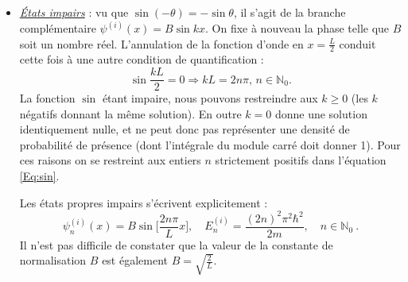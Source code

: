 \begin{enumerate}
{\begin{itemize}[label=$\rhd$]
Les états propres pairs sont donc donnés par
\begin{equation}
\boxed{
\psi_n^{(p)} (x) = A \cos \Big[ \frac{(2n+1)\pi}{L} x \Big], \quad E_n^{(p)} = \frac{(2n+1)^2\pi^2\hbar^2}{2m}, \quad  n\in\mathbb{N}\ .
}
\end{equation}
On détermine enfin la constante de normalisation $A$ :
\begin{equation}
\begin{split}
\int_{-\frac{L}{2}}^{+\frac{L}{2}} dx \, |\psi_n^{(p)} (x)|^2 &= 2 \int_{0}^{\frac{L}{2}} dx \, A^2 \cos^2 \Big[ \frac{(2n+1)\pi}{L} x \Big] \\
&= \int_{0}^{\frac{L}{2}} dx \, A^2 \Big[ 1 + \cos \Big[ (2n+1)\frac{2\pi}{L} x \Big] \Big] \\
&= \frac{L}{2} A^2 + A^2 \Big( (2n+1)\frac{2\pi}{L} \Big)^{-1} \left[ \sin \Big[ (2n+1)\frac{2\pi}{L} x \Big] \right]_{0}^{\frac{L}{2}} \\
&= \frac{L}{2} A^2 \alpha^2 + 0 = 1 \Rightarrow \boxed{A = \sqrt{\frac{2}{L}}.}
\end{split}
\end{equation}
\item \underline{\textit{États impairs}} : vu que $\sin(-\theta) = -\sin \theta$, il s'agit de la branche complémentaire $\psi^{(i)} (x) = B \sin kx$. On fixe à nouveau la phase telle que $B$ soit un nombre réel. L'annulation de la fonction d'onde en $x = \frac{L}{2}$ conduit cette fois à une autre condition de quantification :
\begin{equation}
\sin \frac{kL}{2} = 0 \Rightarrow k L = 2n\pi, \, n\in\mathbb{N}_0.
\label{Eq:sin}
\end{equation}
La fonction $\sin$ étant impaire, nous pouvons restreindre aux $k\geq 0$ (les $k$ négatifs donnant la même solution). En outre $k=0$ donne une solution identiquement nulle, et ne peut donc pas représenter une densité de probabilité de présence (dont l'intégrale du module carré doit donner 1). Pour ces raisons on se restreint aux entiers $n$ strictement positifs dans l'équation \eqref{Eq:sin}.

 Les états propres impairs s'écrivent explicitement :
\begin{equation}
\boxed{
\psi_n^{(i)} (x) = B \sin \Big[ \frac{2n\pi}{L} x \Big], \quad E_n^{(i)} = \frac{(2n)^2\pi^2\hbar^2}{2m}, \quad  n\in\mathbb{N}_0\ .
}
\end{equation}
Il n'est pas difficile de constater que la valeur de la constante de normalisation $B$ est également $B = \sqrt{\frac{2}{L}}$. 
\end{itemize}

}
\end{enumerate}

